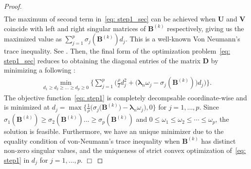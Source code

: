 \documentclass[alpha-refs]{wiley-article}
\begin{document}
\begin{proof}
\begin{align}
\end{align}
The maximum of second term in~\eqref{eq: step1_sec} can be achieved when $\boldsymbol{U}$ and $\boldsymbol{V}$ coincide with
left and right singular matrices of $\boldsymbol{B}^{(k)}$ respectively, giving us the maximized value as $\sum_{j=1}^{p}\sigma_{j}(\boldsymbol{B}^{(k)})d_{j}$.
This is a well-known Von Neumann's trace inequality.
See \cite{von1937some,mirsky1975trace}.
Then, the final form of the optimization problem~\eqref{eq: step1_sec} reduces to obtaining the diagonal entries of the matrix $\boldsymbol{D}$ by minimizing a following :
\begin{align}
    \min_{d_{1}\geq d_{2}\geq \dots \geq d_{p} \geq 0 }\bigg\{ \sum_{j=1}^{p} \bigg( \frac{\rho}{2} d_{j}^{2} + \big( \boldsymbol{\lambda}_{n} \omega_{j}-\sigma_{j}(\boldsymbol{B}^{(k)}) \big) d_{j} \bigg)  \bigg\}. \label{eq: step1}
\end{align}
The objective function~\eqref{eq: step1} is completely decompsable coordinate-wise and is minimized at $d_{j}=\max\big\{\frac{1}{\rho}\big(\sigma_{j}(\boldsymbol{B}^{(k)}\big)-\boldsymbol{\lambda}_{n} \omega_{j}\big),0 \big\}$ for $j=1,\dots,p$.
Since $\sigma_{1}(\boldsymbol{B}^{(k)})\geq\sigma_{2}(\boldsymbol{B}^{(k)})\dots\geq\sigma_{p}(\boldsymbol{B}^{(k)})$ and $0\leq\omega_{1}\leq\omega_{2}\leq\cdots\leq\omega_{p}$, the solution is feasible.
Furthermore, we have an unique minimizer due to the equality condition of von-Neumann's trace inequality when $\boldsymbol{B}^{(k)}$ has distinct non-zero singular values, and the uniqueness of strict convex optimization  of~\eqref{eq: step1} in $d_{j}$ for $j=1,\dots,p$.
\qquad \qquad \qquad \qquad \qquad \qquad \qquad \qquad \qquad \qquad \qquad \qquad \qquad \qquad \qquad \qquad
\qquad \qquad \qquad \qquad \qquad \qquad \quad $\Box$
\end{proof}
\end{document}
